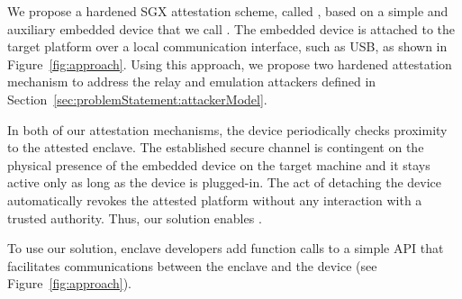 We propose a hardened SGX attestation scheme, called \name, based on a simple and auxiliary embedded device that we call \device. %
The embedded device is attached to the target platform over a local communication interface, such as USB, as shown in  Figure~\ref{fig:approach}. Using this approach, we propose two hardened attestation mechanism to address the relay and emulation attackers defined in Section~\ref{sec:problemStatement:attackerModel}.




In both of our attestation mechanisms, the \device device periodically checks proximity to the attested enclave. The established secure channel is contingent on the physical presence of the embedded device on the target machine and it stays active only as long as the device is plugged-in. The act of detaching the device automatically revokes the attested platform without any interaction with a trusted authority. Thus, our solution enables \propname. 

To use our solution, enclave developers add function calls to a simple \name API that facilitates communications between the enclave and the device (see Figure~\ref{fig:approach}).


